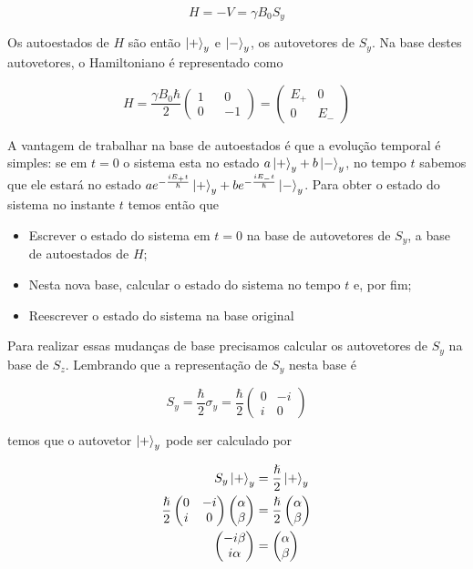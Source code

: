 \documentclass[a4paper, 12pt, notitlepage]{article}
\begin{document}
\begin{enumerate}
\begin{enumerate}[(a)]
\[ H = -V = \gamma B_0 S_y \]

Os autoestados de $H$ são então $\ket{+}_y$ e $\ket{-}_y$, os autovetores de $S_y$. Na base destes autovetores, o Hamiltoniano é representado como

\[ H = \frac{\gamma B_0 \hbar}{2} 
  \begin{pmatrix} 
  1 && 0 \\
  0 && -1
  \end{pmatrix} = \begin{pmatrix}
  E_+ & 0 \\
  0 & E_-
  \end{pmatrix}
\]

A vantagem de trabalhar na base de autoestados é que a evolução temporal é simples: se em $t=0$ o sistema esta no estado $a \ket{+}_y + b\ket{-}_y$, no tempo $t$ sabemos que ele estará no estado $ae^{-\frac{iE_+t}{\hslash}} \ket{+}_y + be^{-\frac{iE_-t}{\hslash}} \ket{-}_y$. Para obter o estado do sistema no instante $t$ temos então que

\begin{itemize}
  \item Escrever o estado do sistema em $t=0$ na base de autovetores de $S_y$, a base de autoestados de $H$;
  \item Nesta nova base, calcular o estado do sistema no tempo $t$ e, por fim;
  \item Reescrever o estado do sistema na base original
\end{itemize}

Para realizar essas mudanças de base precisamos calcular os autovetores de $S_y$ na base de $S_z$. Lembrando que a representação de $S_y$ nesta base é

\[ S_y = \frac{\hbar}{2}\sigma_y = \frac{\hbar}{2} \begin{pmatrix} 0 & -i \\ i & 0 \end{pmatrix} \]

\noindent temos que o autovetor $\ket{+}_y$ pode ser calculado por

\begin{align*}
  S_y \ket{+}_y &= \frac{\hslash}{2} \ket{+}_y \\
  \frac{\hslash}{2} \begin{pmatrix} 0 & -i \\ i & 0 \end{pmatrix}  \begin{pmatrix} \alpha \\ \beta \end{pmatrix} &=
  \frac{\hslash}{2} \begin{pmatrix} \alpha \\ \beta \end{pmatrix} \\
  \begin{pmatrix}-i\beta \\ i\alpha \end{pmatrix} &= \begin{pmatrix} \alpha \\ \beta \end{pmatrix}
\end{align*}


\end{enumerate}
\end{enumerate}
\end{document}
